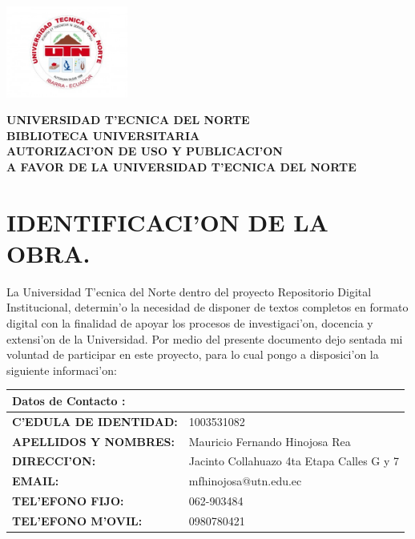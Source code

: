 


\begin{center}
  \includegraphics[width=0.3\textwidth]{utn}  
	
\end{center}
	\begin{center}
	\textbf{
	UNIVERSIDAD T'ECNICA DEL NORTE \\
	BIBLIOTECA UNIVERSITARIA \\
	AUTORIZACI'ON DE USO Y PUBLICACI'ON \\
	A FAVOR DE LA UNIVERSIDAD T'ECNICA DEL NORTE 
	}
	\end{center}


\section*{\normalsize IDENTIFICACI'ON DE LA OBRA.}
La Universidad T'ecnica del Norte dentro del proyecto Repositorio Digital Institucional, determin'o la necesidad de disponer de textos completos en formato digital con la finalidad de apoyar los procesos de investigaci'on, docencia y extensi'on de la Universidad. Por medio del presente documento dejo sentada mi voluntad de participar en este proyecto, para lo cual pongo a disposici'on la siguiente informaci'on:  



\begin{tabular}[h] {|| p{5cm}| p{9cm} ||}



\hline
\multicolumn{2}{|l|}{\textbf{Datos de Contacto :}}\\ 
\hline \hline
\textbf{C'EDULA DE IDENTIDAD:} &	1003531082 \\ \hline
\textbf{APELLIDOS Y NOMBRES:} & Mauricio Fernando Hinojosa Rea \\ \hline
\textbf{DIRECCI'ON:} &	Jacinto Collahuazo 4ta Etapa Calles G y 7 \\ \hline
\textbf{EMAIL:} & mfhinojosa@utn.edu.ec \\ \hline

\textbf{TEL'EFONO FIJO: }&	062-903484 \\ \hline
\textbf{TEL'EFONO M'OVIL: }&	0980780421 \\ \hline



\end{tabular}

